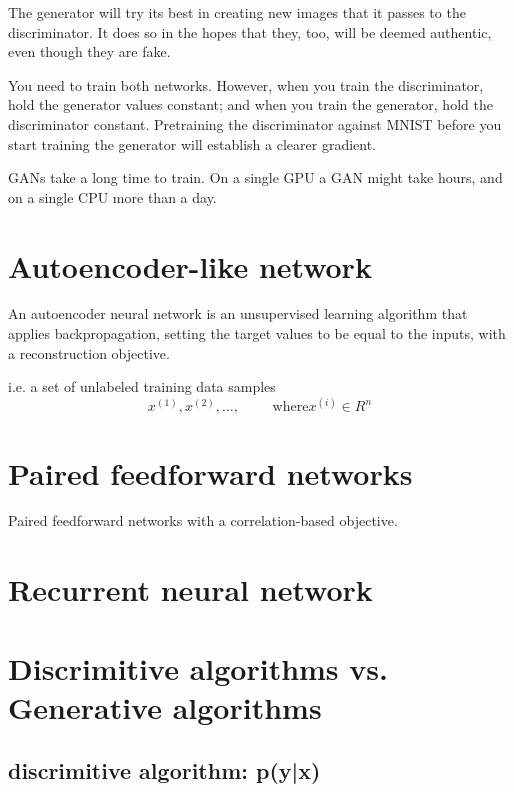 The generator will try its best in creating new images that it passes to the
discriminator. It does so in the hopes that they, too, will be deemed authentic,
even though they are fake.

You need to train both networks.
However, when you train the discriminator, hold the generator values constant;
and when you train the generator, hold the discriminator constant.
Pretraining the discriminator against MNIST before you start training the
generator will establish a clearer gradient.


GANs take a long time to train. On a single GPU a GAN might take hours, and on a
single CPU more than a day.






\section{Autoencoder-like network}
\label{sec:autoencoder}


An autoencoder neural network is an unsupervised learning algorithm that
applies backpropagation, setting the target values to be equal to the inputs,
with a reconstruction objective.

i.e. a set of unlabeled training data samples
\begin{equation}
{ x^{(1)}, x^{(2)}, \ldots}, \qquad \text{ where} x^{(i)} \in R^n
\end{equation}

\section{Paired feedforward networks}

Paired feedforward networks with a correlation-based objective.


\section{Recurrent neural network}
\label{sec:recurrent-neural-network}


\section{Discrimitive algorithms vs. Generative algorithms}

\subsection{discrimitive algorithm: p(y|x)}
\label{sec:discrimitive-algorithm}

